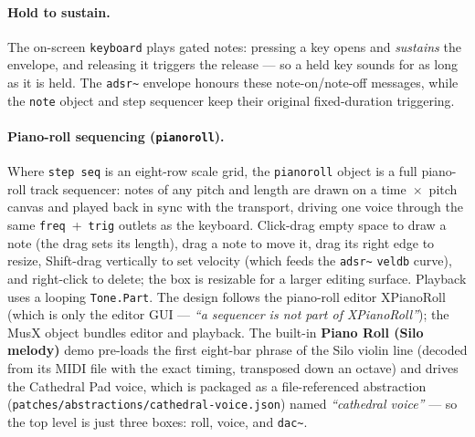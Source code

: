 \documentclass[11pt,letterpaper]{article}
\begin{document}
\paragraph{Hold to sustain.} The on-screen \texttt{keyboard} plays gated notes: pressing a key
opens and \emph{sustains} the envelope, and releasing it triggers the release --- so a held key
sounds for as long as it is held. The \texttt{adsr\~{}} envelope honours these note-on/note-off
messages, while the \texttt{note} object and step sequencer keep their original fixed-duration
triggering.

\paragraph{Piano-roll sequencing (\texttt{pianoroll}).} Where \texttt{step seq} is an eight-row
scale grid, the \texttt{pianoroll} object is a full piano-roll track sequencer: notes of any pitch
and length are drawn on a time~$\times$~pitch canvas and played back in sync with the transport,
driving one voice through the same \texttt{freq}~+~\texttt{trig} outlets as the keyboard. Click-drag
empty space to draw a note (the drag sets its length), drag a note to move it, drag its right edge
to resize, Shift-drag vertically to set velocity (which feeds the \texttt{adsr\~{}} \texttt{veldb}
curve), and right-click to delete; the box is resizable for a larger editing surface. Playback uses
a looping \texttt{Tone.Part}. The design follows the piano-roll editor XPianoRoll~\cite{xpianoroll}
(which is only the editor GUI --- \emph{``a sequencer is not part of XPianoRoll''}); the MusX object
bundles editor and playback. The built-in \textbf{Piano Roll (Silo melody)} demo pre-loads the
first eight-bar phrase of the Silo violin line (decoded from its MIDI file with the exact timing,
transposed down an octave) and drives the Cathedral Pad voice, which is packaged as a
file-referenced abstraction (\texttt{patches/abstractions/cathedral-voice.json}) named
\emph{``cathedral voice''} --- so the top level is just three boxes: roll, voice, and \texttt{dac\~{}}.
\end{document}
